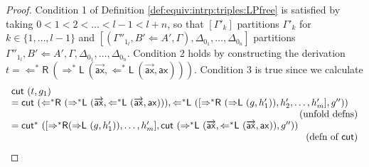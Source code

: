 \documentclass[a4paper,UKenglish,cleveref,autoref,thm-restate, anonymous]{lipics-v2021}
\renewcommand{\vec}[1]{\overrightarrow{#1}}
\newcommand{\Larr}{\Leftarrow}
\newcommand{\Ls}{\Leftarrow^*}
\newcommand{\Rarr}{\Rightarrow}
\newcommand{\Rs}{\Rightarrow^*}
\newcommand{\mf}[1]{\mathsf{#1}}
\newcommand{\GG}{\Gamma}
\newcommand{\GD}{\Delta}
\newcommand{\vd}{\vdash}
\newcommand{\ax}{\mathsf{ax}}
\newcommand{\Ll}{{\Larr}\mathsf{L}}
\newcommand{\Lsl}{{\Ls}\mathsf{L}}
\newcommand{\Lsr}{{\Ls}\mathsf{R}}
\newcommand{\Rl}{{\Rarr}\mathsf{L}}
\newcommand{\Rsl}{{\Rs}\mathsf{L}}
\newcommand{\Rsr}{{\Rs}\mathsf{R}}
\newcommand{\cut}{\mf{cut}}
\newcommand{\cuts}{\mf{cut}^*}
\begin{document}
\begin{proof}
Condition 1 of Definition \ref{def:equiv:intrp:triples:LPfree} is satisfied by taking $0 < 1 < 2 < \dots < l-1 < l + n$, so that $[\GG'_k]$ partitions $\GG'_k$ for $k \in \{1,\dots,l-1\}$ and $[(\GG''_{1_l} , B'\Larr A',\GG),\GD_{0_1},\dots,\GD_{0_n}]$ partitions  $\GG''_{1_l} , B'\Larr A',\GG,\GD_{0_1},\dots,\GD_{0_n}$.
Condition 2 holds by constructing the derivation $t = \Lsr \ (\Rsl \ (\vec{\ax}, \Lsl \ (\vec{\ax}, \ax)))$.
Condition 3 is true since we calculate
\[
\begin{array}{lr}
  \cut\ (t,g_1) & \\
  =\cut\ (\Lsr \ (\Rsl \ (\vec{\ax}, \Lsl \ (\vec{\ax}, \ax))), \Lsl \ ([\Rsr \ (\Rl \ (g, h'_1)), h'_2,\dots,h'_m], g''))
    &
    \\
    &\hspace*{-5cm}\text{(unfold defns)}
    \\
    = \cuts \ ([\Rsr (\Rl \ (g, h'_1)), \dots, h'_m], \cut\ (\Rsl\ (\vec{\ax}, \Lsl \ (\vec{\ax},\ax)),g''))&
    \\
    &\hspace*{-5cm}\text{(defn of $\cut$)}

\end{array}\]
\end{proof}
\end{document}

